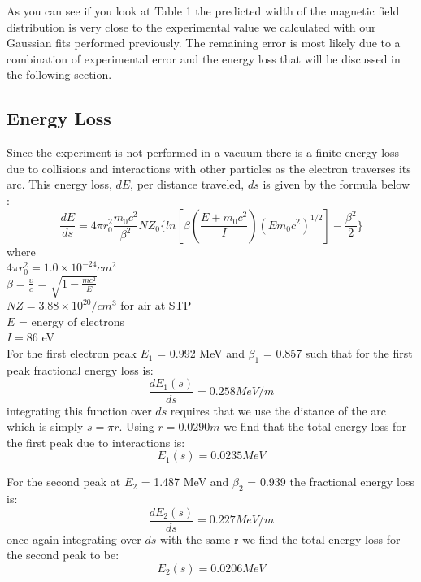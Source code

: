 As you can see if you look at Table 1 the predicted width of the magnetic field distribution is very close to the experimental value we calculated with our Gaussian fits performed previously.  The remaining error is most likely due to a combination of experimental error and the energy loss that will be discussed in the following section. 

\subsection {Energy Loss}
Since the experiment is not performed in a vacuum there is a finite energy loss due to collisions and interactions with other particles as the electron traverses its arc.  This energy loss, $dE$, per distance traveled, $ds$ is given by the formula below \cite{bethe}:
\begin{equation}
\frac{dE}{ds} = 4\pi r^{2}_{0} \frac{m_{0}c^{2}}{\beta^{2}} N Z_{0} \{ ln[\beta (\frac{E+m_{0}c^{2}}{I})({E}{m_{0}c^{2}})^{1/2} ] - \frac{\beta^{2}}{2} \} 
\end{equation} 
where\\
$4\pi r_{0}^{2} = 1.0 \times 10^{-24} cm^{2}$\\
$\beta = \frac{\upsilon}{c}$ = $\sqrt{1-\frac{mc^{2}}{E}}$\\
$NZ = 3.88 \times 10^{20} / cm^{3}$ for air at STP\\
$E$ = energy of electrons\\
$I = 86$ eV\\

For the first electron peak $E_1$ = 0.992 MeV and $\beta_1$ = 0.857 such that for the first peak fractional  energy loss is:
\begin{equation}
\frac{dE_1(s)}{ds} = 0.258 MeV/m
\end{equation}
integrating this function over $ds$ requires that we use the distance of the arc which is simply $s=\pi r$. Using $r = 0.0290 m$ we find that the total energy loss for the first peak due to interactions is:
\begin{equation}
E_1(s) = 0.0235 MeV
\end{equation} 

For the second peak at $E_2$ = 1.487 MeV and $\beta_2$ = 0.939 the fractional energy loss is:
\begin{equation}
\frac{dE_2(s)}{ds} = 0.227 MeV/m
\end{equation}
once again integrating over $ds$ with the same r we find the total energy loss for the second peak to be:
\begin{equation}
E_2 (s)= 0.0206 MeV
\end{equation}

